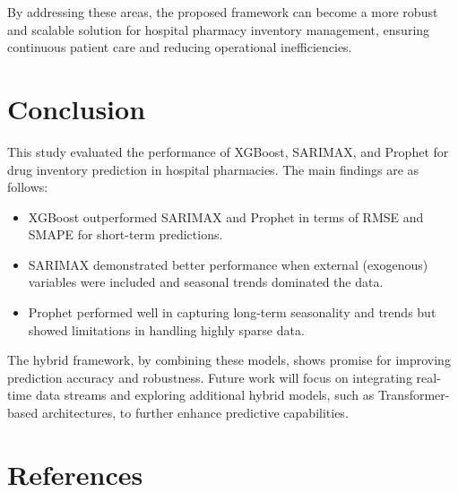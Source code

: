 \documentclass[journal]{IEEEtran}
\begin{document}
By addressing these areas, the proposed framework can become a more robust and scalable solution for hospital pharmacy inventory management, ensuring continuous patient care and reducing operational inefficiencies.

\section{Conclusion}
This study evaluated the performance of XGBoost, SARIMAX, and Prophet for drug inventory prediction in hospital pharmacies. The main findings are as follows:

\begin{itemize}
    \item XGBoost outperformed SARIMAX and Prophet in terms of RMSE and SMAPE for short-term predictions.
    \item SARIMAX demonstrated better performance when external (exogenous) variables were included and seasonal trends dominated the data.
    \item Prophet performed well in capturing long-term seasonality and trends but showed limitations in handling highly sparse data.
\end{itemize}

The hybrid framework, by combining these models, shows promise for improving prediction accuracy and robustness. Future work will focus on integrating real-time data streams and exploring additional hybrid models, such as Transformer-based architectures, to further enhance predictive capabilities.

\section{References}
\end{document}
